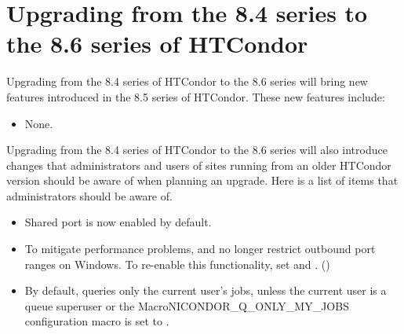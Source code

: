 \section{\label{sec:to-8.6}Upgrading from the 8.4 series to the 8.6 series of HTCondor}

Upgrading from the 8.4 series of HTCondor to the 8.6 series
will bring new features introduced in the 8.5 series of HTCondor.
These new features include:
\begin{itemize}

\item None.

\end{itemize}

Upgrading from the 8.4 series of HTCondor to the 8.6 series will
also introduce changes that administrators and users of sites running from an older
HTCondor version should be aware of when planning an upgrade.
Here is a list of items that administrators should be aware of.

\begin{itemize}

\item Shared port is now enabled by default.

\item To mitigate performance problems,  and
 no longer restrict outbound port ranges on Windows.  To
re-enable this functionality, set  and
.  ()

\item By default,  queries only the current user's jobs,
unless the current user is a queue superuser or the
MacroNI{CONDOR\_Q\_ONLY\_MY\_JOBS} configuration macro is set to
.


\end{itemize}

